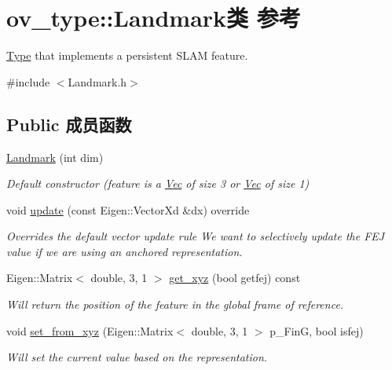 \hypertarget{classov__type_1_1Landmark}{}\section{ov\+\_\+type\+:\+:Landmark类 参考}
\label{classov__type_1_1Landmark}


\hyperlink{classov__type_1_1Type}{Type} that implements a persistent S\+L\+AM feature.  




{\ttfamily \#include $<$Landmark.\+h$>$}

\subsection*{Public 成员函数}
\begin{DoxyCompactItemize}
\item 
\mbox{\label{classov__type_1_1Landmark_afdfcac1cff90284cc815bd1c17c2659d}} 
\hyperlink{classov__type_1_1Landmark_afdfcac1cff90284cc815bd1c17c2659d}{Landmark} (int dim)
\begin{DoxyCompactList}\small\item\em Default constructor (feature is a \hyperlink{classov__type_1_1Vec}{Vec} of size 3 or \hyperlink{classov__type_1_1Vec}{Vec} of size 1) \end{DoxyCompactList}\item 
void \hyperlink{classov__type_1_1Landmark_aae8c688f5bb601edcb38fde41ff04297}{update} (const Eigen\+::\+Vector\+Xd \&dx) override
\begin{DoxyCompactList}\small\item\em Overrides the default vector update rule We want to selectively update the F\+EJ value if we are using an anchored representation. \end{DoxyCompactList}\item 
Eigen\+::\+Matrix$<$ double, 3, 1 $>$ \hyperlink{classov__type_1_1Landmark_aa4f66d5e3954beea3f05b8b757561132}{get\+\_\+xyz} (bool getfej) const
\begin{DoxyCompactList}\small\item\em Will return the position of the feature in the global frame of reference. \end{DoxyCompactList}\item 
void \hyperlink{classov__type_1_1Landmark_ac34319e2057c3c63154cef9a9aa08a2e}{set\+\_\+from\+\_\+xyz} (Eigen\+::\+Matrix$<$ double, 3, 1 $>$ p\+\_\+\+FinG, bool isfej)
\begin{DoxyCompactList}\small\item\em Will set the current value based on the representation. \end{DoxyCompactList}\end{DoxyCompactItemize}
